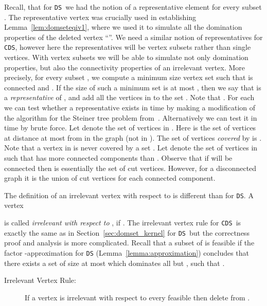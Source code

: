 \documentclass[11pt]{article}
\newcommand{\tDS}{{\texttt{\sc DS}}}
\newcommand{\tCDS}{{\texttt{\sc CDS}}}
\begin{document}
Recall, that for \tDS \, we had the notion of a representative element for every subset . The representative vertex was crucially used in establishing  Lemma~\ref{lem:domseteqiv1}, where we used it to simulate all the domination properties of the deleted vertex ``''.  We need a similar notion of representatives for \tCDS, however here the representatives will be vertex subsets rather than single vertices. With vertex subsets we will be able to simulate not only   domination properties, but also the connectivity properties of an  irrelevant vertex. More precisely, for every subset , we compute a minimum size vertex set  such that  is connected and . If the size of such a minimum set is at most , then we say that  is a {\em representative} of , and add all the vertices in  to the set . Note that .
For each    we can test whether a representative exists in time  by making a modification of the algorithm for the  Steiner tree problem from~\cite{BjorklundHKK07}. Alternatively we can test it in time  by brute force. Let  denote the set of vertices in 
. Here  is the set of vertices at distance at most  from  in the graph  (not in ). 
The set of vertices \emph{covered} by  is . Note that a vertex in  is never covered by a set .  Let  denote the set of vertices   in  such that  has more connected components than . Observe that if  will be connected  then  is essentially the set of cut vertices. However, for a disconnected graph it is the union of cut vertices for each connected component. 

The definition of an irrelevant vertex with respect to  is   different than for \tDS{}. A vertex
 
  is called {\em irrelevant with respect to }, if .  The irrelevant vertex rule for \tCDS \, is exactly the same as in Section~\ref{sec:domset_kernel} for \tDS \, but the correctness proof and analysis is more complicated. Recall that a subset  of  is feasible if the factor -approximation for \tDS{} (Lemma~\ref{lemma:approximation})  concludes that there exists a set  of size 
at most  which dominates all but , such that .

\begin{description}
\item[Irrelevant Vertex Rule:] If a vertex  is irrelevant with respect to every feasible  then delete  from . 
\end{description}
\end{document}

